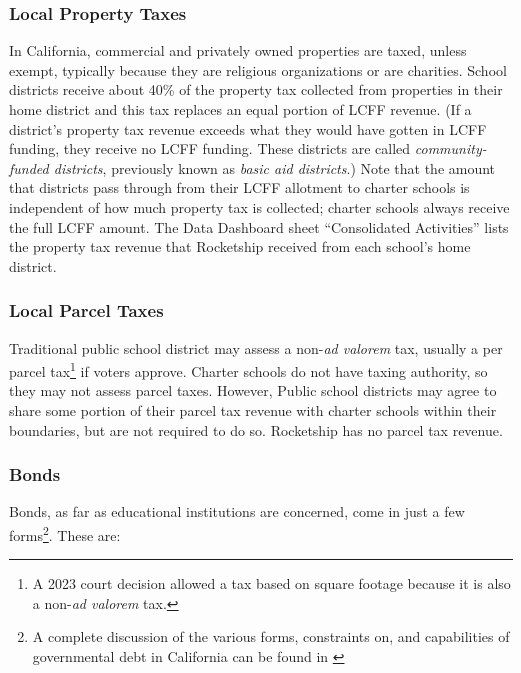 \subsubsection{Local Property Taxes}%
\label{sec:property-taxes}\indent%

In California, commercial and privately owned properties are taxed, unless exempt, typically because they are religious organizations or are charities. School districts receive about 40\% of the property tax collected from properties in their home district and this tax replaces an equal portion of LCFF revenue. (If a district's property tax revenue exceeds what they would have gotten in LCFF funding, they receive no LCFF funding. These districts are called \textit{community-funded districts}, previously known as \textit{basic aid districts}.) Note that the amount that districts pass through from their LCFF allotment to charter schools is independent of how much property tax is collected; charter schools always receive the full LCFF amount. The Data Dashboard sheet ``Consolidated Activities'' lists the property tax revenue that Rocketship received from each school's home district.

\subsubsection{Local Parcel Taxes}%
\label{sec:parcel-taxes}\indent%

Traditional public school district may assess a non-\textit{ad valorem} tax, usually a per parcel tax\footnote{A 2023 court decision allowed a tax based on square footage because it is also a non-\textit{ad valorem} tax.} if voters approve. Charter schools do not have taxing authority, so they may not assess parcel taxes. However, Public school districts may agree to share some portion of their parcel tax revenue with charter schools within their boundaries, but are not required to do so. Rocketship has no parcel tax revenue.

\subsubsection{Bonds}%
\label{sec:bonds}\indent%

Bonds, as far as educational institutions are concerned, come in just a few forms\footnote{A complete discussion of the various forms, constraints on, and capabilities of governmental debt in California can be found in  \parencite{CDIAC2023}}. These are:

